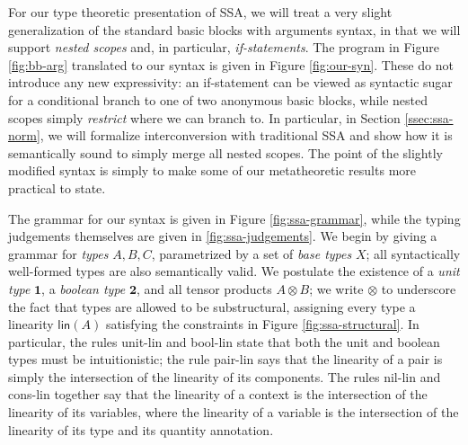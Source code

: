 \documentclass[acmsmall,screen,review]{acmart}
\newcommand{\mb}[1]{\ensuremath{\mathbf{#1}}}
\newcommand{\ms}[1]{\ensuremath{\mathsf{#1}}}
\newcommand{\rle}[1]{{\scriptsize\textsf{#1}}}
\begin{document}
For our type theoretic presentation of SSA, we will treat a very slight
generalization of the standard basic blocks with arguments syntax, in that we
will support \textit{nested scopes} and, in particular, \textit{if-statements}.
The program in Figure \ref{fig:bb-arg} translated to our syntax is given in
Figure \ref{fig:our-syn}. These do not introduce any new expressivity: an
if-statement can be viewed as syntactic sugar for a conditional branch to one of
two anonymous basic blocks, while nested scopes simply \textit{restrict} where
we can branch to. In particular, in Section \ref{ssec:ssa-norm}, we will
formalize interconversion with traditional SSA and show how it is semantically
sound to simply merge all nested scopes. The point of the slightly modified
syntax is simply to make some of our metatheoretic results more practical to
state.

The grammar for our syntax is given in Figure \ref{fig:ssa-grammar}, while the
typing judgements themselves are given in \ref{fig:ssa-judgements}. We begin by
giving a grammar for \textit{types} \(A, B, C\), parametrized by a set of
\textit{base types} \(X\); all syntactically well-formed types are also
semantically valid. We postulate the existence of a \textit{unit type}
\(\mb{1}\), a \textit{boolean type} \(\mb{2}\), and all tensor products \(A
\otimes B\); we write \(\otimes\) to underscore the fact that types are allowed
to be substructural, assigning every type a linearity \(\ms{lin}(A)\) satisfying
the constraints in Figure \ref{fig:ssa-structural}. In particular, the rules
\rle{unit-lin} and \rle{bool-lin} state that both the unit and boolean types
must be intuitionistic; the rule \rle{pair-lin} says that the linearity of a
pair is simply the intersection of the linearity of its components. The rules
\rle{nil-lin} and \rle{cons-lin} together say that the linearity of a context is
the intersection of the linearity of its variables, where the linearity of a
variable is the intersection of the linearity of its type and its quantity
annotation.
\end{document}
